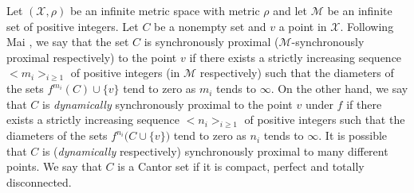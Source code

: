 \documentclass[12pt]{article}
\begin{document}
Let $(\mathcal X, \rho)$ be an infinite metric space with metric $\rho$ and let $\mathcal M$ be an infinite set of positive integers.  Let $C$ be a nonempty set and $v$ a point in $\mathcal X$.  Following Mai {\bf\cite{mai}}, we say that the set $C$ is synchronously proximal ($\mathcal M$-synchronously proximal respectively) to the point $v$ if there exists a strictly increasing sequence $< m_i >_{i \ge 1}$ of positive integers (in $\mathcal M$ respectively) such that the diameters of the sets $f^{m_i}(C) \cup \{ v \}$ tend to zero as $m_i$ tends to $\infty$.  On the other hand, we say that $C$ is {\it dynamically} synchronously proximal to the point $v$ under $f$ if there exists a strictly increasing sequence $< n_i >_{i \ge 1}$ of positive integers such that the diameters of the sets $f^{n_i}\big(C \cup \{ v \}\big)$ tend to zero as $n_i$ tends to $\infty$.  It is possible that $C$ is ({\it dynamically} respectively) synchronously proximal to many different points.  We say that $C$ is a Cantor set if it is compact, perfect and totally disconnected.
\end{document}
